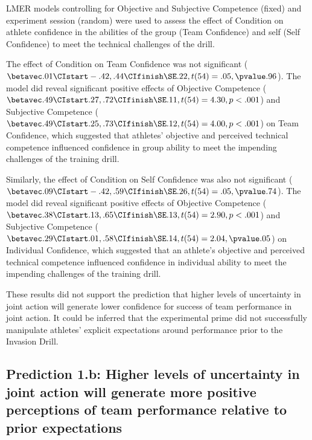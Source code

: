 \begin{CJK}{UTF8}{gbsn}
LMER models controlling for Objective and Subjective Competence (fixed) and experiment session (random) were used to assess the effect of Condition on athlete confidence in the abilities of the group (Team Confidence) and self (Self Confidence) to meet the technical challenges of the drill.

The effect of Condition on Team Confidence was not significant ($\betavec .01 \CIstart -.42, .44 \CIfinish \SE .22, t(54)= .05, \pvalue .96$). The model did reveal significant positive effects of Objective Competence ($\betavec .49 \CIstart .27, .72 \CIfinish \SE .11, t(54)= 4.30, p <.001$) and Subjective Competence ($\betavec .49 \CIstart .25, .73 \CIfinish \SE .12, t(54)= 4.00, p < .001$) on Team Confidence, which suggested that athletes' objective and perceived technical competence influenced confidence in group ability to meet the impending challenges of the training drill.

Similarly, the effect of Condition on Self Confidence was also not significant ($\betavec .09 \CIstart -.42, .59 \CIfinish \SE .26, t(54)= .05, \pvalue .74$).
The model did reveal significant positive effects of Objective Competence ($\betavec .38 \CIstart .13, .65 \CIfinish \SE .13, t(54)= 2.90, p <.001$) and Subjective Competence ($\betavec .29 \CIstart .01, .58 \CIfinish \SE .14, t(54)= 2.04, \pvalue .05$) on Individual Confidence, which suggested that an athlete's objective and perceived technical competence influenced confidence in individual ability to meet the impending challenges of the training drill.

These results did not support the prediction that higher levels of uncertainty in joint action will generate lower confidence for success of team performance in joint action.  It could be inferred that the experimental prime did not successfully manipulate athletes' explicit expectations around performance prior to the Invasion Drill.


\subsection{Prediction 1.b: Higher levels of uncertainty in joint action will generate more positive perceptions of team performance relative to prior expectations}



\end{CJK}
